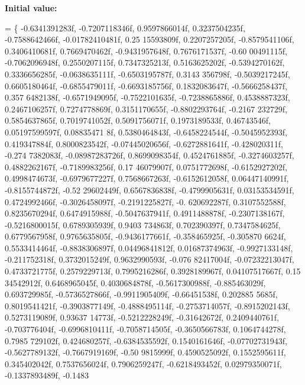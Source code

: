 {\bfseries Initial value\+:}
\begin{DoxyCode}
=
    \{
        -0.6341391283f, -0.7207118346f, 0.9597866014f, 0.3237504235f, -0.7588642466f, -0.01782410481f, 0.25
      15593809f, 0.2207257205f, -0.8579541106f, 0.3406410681f, 0.7669470462f, -0.9431957648f, 0.7676171537f, -0.60
      00491115f, -0.7062096948f, 0.2550207115f,
        0.7347325213f, 0.5163625202f, -0.5394270162f, 0.3336656285f, -0.0638635111f, -0.6503195787f, 0.3143
      356798f, -0.5039217245f, 0.6605180464f, -0.6855479011f, -0.6693185756f, 0.1832083647f, -0.5666258437f, 0.357
      6482138f, -0.6571949095f, -0.7522101635f,
        -0.7238865886f, 0.4538887323f, 0.2467106257f, 0.7274778869f, 0.3151170655f, -0.8802293764f, -0.2167
      232729f, 0.5854637865f, 0.7019741052f, 0.5091756071f, 0.1973189533f, 0.46743546f, 0.05197599597f, 0.08835471
      8f, 0.5380464843f, -0.6458224544f,
        -0.5045952393f, 0.419347884f, 0.8000823542f, -0.07445020656f, -0.6272881641f, -0.428020311f, -0.274
      7382083f, -0.08987283726f, 0.8699098354f, 0.4524761885f, -0.3274603257f, 0.4882262167f, -0.7189983256f, 0.17
      46079907f, 0.0751772698f, -0.6152927202f,
        0.4998474673f, -0.6979677227f, 0.7568667263f, -0.6152612058f, 0.06447140991f, -0.8155744872f, -0.52
      29602449f, 0.6567836838f, -0.4799905631f, 0.03153534591f, 0.4724992466f, -0.3026458097f, -0.2191225827f, -0.
      620692287f, 0.3107552588f, 0.8235670294f,
        0.6474915988f, -0.5047637941f, 0.4911488878f, -0.2307138167f, -0.5216800015f, 0.6789305939f, 0.9403
      734863f, 0.702390397f, 0.7347584625f, 0.6779567958f, 0.9765635805f, -0.9436177661f, -0.358465925f, -0.305870
      6624f, 0.5533414464f, -0.8838306897f,
        0.04496841812f, 0.01687374963f, -0.9927133148f, -0.211752318f, 0.3732015249f, 0.9632990593f, -0.076
      82417004f, -0.07232213047f, 0.4733721775f, 0.2579229713f, 0.7995216286f, 0.3928189967f, 0.04107517667f, 0.15
      34542912f, 0.6468965045f, 0.4030684878f,
        -0.5617300988f, -0.885463029f, 0.693729985f, -0.5736527866f, -0.9911905409f, -0.66451538f, 0.202885
      5685f, 0.8019541421f, -0.3903877149f, -0.4888495114f, -0.2753714057f, -0.8915202143f, 0.5273119089f, 0.93637
      14773f, -0.5212228249f, -0.31642672f,
        0.2409440761f, -0.703776404f, -0.6996810411f, -0.7058714505f, -0.3650566783f, 0.1064744278f, 0.7985
      729102f, 0.424680257f, -0.6384535592f, 0.1540161646f, -0.07702731943f, -0.5627789132f, -0.7667919169f, -0.50
      9815999f, 0.4590525092f, 0.1552595611f,
        0.345402042f, 0.7537656024f, 0.7906259247f, -0.6218493452f, 0.02979350071f, -0.1337893489f, -0.1483

\end{DoxyCode}
